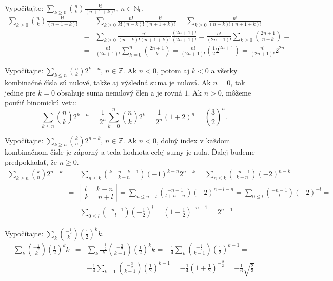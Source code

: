 
\pr Vypočítajte: $\sum_{k\geq0} {n \choose k}\frac{k!}{\left(n+1+k\right)!}$, $n\in \mathbb{N}_0$.
\begin{eqnarray*}
\sum_{k\geq0} {n \choose k}\frac{k!}{\left(n+1+k\right)!} &=& \sum_{k\geq0} \frac{n!}{k!\left(n-k\right)!}\frac{k!}{\left(n+1+k\right)!} = \sum_{k\geq0}\frac{n!}{\left(n-k\right)!\left(n+1+k\right)!} =\\
&=& \sum_{k\geq0}\frac{n!}{\left(n-k\right)!\left(n+1+k\right)!}\frac{\left(2n+1\right)!}{\left(2n+1\right)!} = \frac{n!}{\left(2n+1\right)!}\sum_{k\geq0} {2n+1 \choose n-k} =\\
&=& \frac{n!}{\left(2n+1\right)!}\sum_{k=0}^n {2n+1 \choose k} = \frac{n!}{\left(2n+1\right)!}\left(\frac12 2^{2n+1}\right) = \frac{n!}{\left(2n+1\right)!}2^{2n}
\end{eqnarray*}

\pr Vypočítajte: $\sum_{k \leq n}{n \choose k}2^{k-n}$, $n \in \mathbb{Z}$.
 Ak $n<0$, potom aj $k<0$ a všetky kombinačné čísla sú nulové, takže aj výsledná suma je nulová. Ak $n=0$, tak jedine pre $k=0$ obsahuje suma nenulový člen a je rovná $1$. Ak $n>0$, môžeme použiť binomickú vetu:
$$
\sum_{k \leq n}{n \choose k}2^{k-n} = \frac1{2^n} \sum_{k=0}^n{n \choose k}2^k = \frac1{2^n} \left(1+2\right)^n = \left(\frac32\right)^n.
$$

\pr Vypočítajte: $\sum_{k \geq n}{k \choose n}2^{n-k}$, $n \in \mathbb{Z}$.
 Ak $n<0$, dolný index v každom kombinačnom čísle je záporný a teda hodnota celej sumy je nula. Ďalej budeme predpokladať, že $n\geq0$.
\begin{eqnarray*}
\sum_{k \geq n}{k \choose n}2^{n-k} &=& \sum_{n\leq k}{k-n-k-1 \choose k-n}\left(-1\right)^{k-n}2^{n-k} = \sum_{n\leq k}{-n-1 \choose k-n}\left(-2\right)^{n-k} = \\
&=& \left |\begin{array}{l}
l = k-n\\
k = n+l
\end{array}\right| = \sum_{n\leq n+l}{-n-1 \choose l+n-n}\left(-2\right)^{n-l-n} = \sum_{0 \leq l} {-n-1\choose l}\left(-2\right)^{-l} = \\
&=& \sum_{0\leq l}{-n-1 \choose l} \left(-\frac12\right)^l = \left(1 - \frac12\right)^{-n-1} = 2^{n+1}
\end{eqnarray*}

\pr Vypočítajte: $\sum_k{-\frac12 \choose k}\left(\frac12\right)^k k$.
\begin{eqnarray*}
\sum_k{-\frac12 \choose k}\left(\frac12\right)^k k &=& \sum_k\frac{-\frac12}k{-\frac32 \choose k-1}\left(\frac12\right)^k k = -\frac14 \sum_k{-\frac32 \choose k-1}\left(\frac12\right)^{k-1} = \\
&=& -\frac14 \sum_{k-1}{-\frac32 \choose k-1}\left(\frac12\right)^{k-1} = -\frac14\left(1+\frac12\right)^{-\frac32} = -\frac16 \sqrt{\frac23}
\end{eqnarray*}


